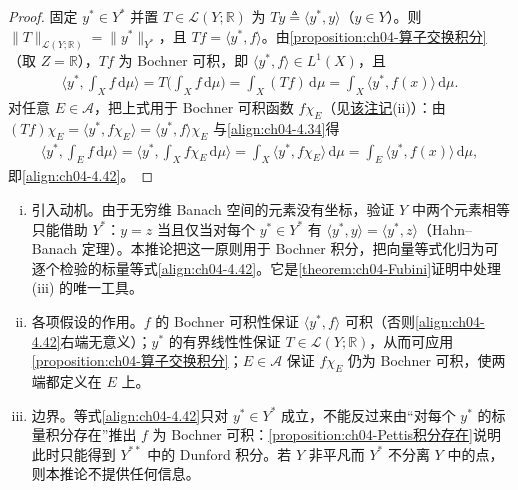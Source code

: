 \documentclass[../../main.tex]{subfiles}%
\begin{document}
\begin{proof}
固定 $y^*\in Y^*$ 并置 $T\in\mathcal{L}(Y;\mathbb{R})$ 为 $Ty\triangleq\langle y^*,y\rangle$（$y\in Y$）。则 $\|T\|_{\mathcal{L}(Y;\mathbb{R})}=\|y^*\|_{Y^*}$，且 $Tf=\langle y^*,f\rangle$。由\cref{proposition:ch04-算子交换积分}（取 $Z=\mathbb{R}$），$Tf$ 为 Bochner 可积，即 $\langle y^*,f\rangle\in L^1(X)$，且
\begin{align*}
\Big\langle y^*,\int_X f\,\mathrm{d}\mu\Big\rangle=T\Big(\int_X f\,\mathrm{d}\mu\Big)=\int_X(Tf)\,\mathrm{d}\mu=\int_X\langle y^*,f(x)\rangle\,\mathrm{d}\mu.
\end{align*}
对任意 $E\in\mathcal{A}$，把上式用于 Bochner 可积函数 $f\chi_E$（见\hyperref[remark:ch04-Bochner良定义]{该注记}(ii)）：由 $(Tf)\chi_E=\langle y^*,f\chi_E\rangle=\langle y^*,f\rangle\chi_E$ 与\eqref{align:ch04-4.34}得
\begin{align*}
\Big\langle y^*,\int_E f\,\mathrm{d}\mu\Big\rangle=\Big\langle y^*,\int_X f\chi_E\,\mathrm{d}\mu\Big\rangle=\int_X\langle y^*,f\chi_E\rangle\,\mathrm{d}\mu=\int_E\langle y^*,f(x)\rangle\,\mathrm{d}\mu,
\end{align*}
即\eqref{align:ch04-4.42}。
\end{proof}

\begin{remark}\label{remark:ch04-对偶配对动机}
\begin{enumerate}[(i)]
\item 引入动机。由于无穷维 Banach 空间的元素没有坐标，验证 $Y$ 中两个元素相等只能借助 $Y^*$：$y=z$ 当且仅当对每个 $y^*\in Y^*$ 有 $\langle y^*,y\rangle=\langle y^*,z\rangle$（Hahn--Banach 定理）。本推论把这一原则用于 Bochner 积分，把向量等式化归为可逐个检验的标量等式\eqref{align:ch04-4.42}。它是\cref{theorem:ch04-Fubini}证明中处理 (iii) 的唯一工具。

\item 各项假设的作用。$f$ 的 Bochner 可积性保证 $\langle y^*,f\rangle$ 可积（否则\eqref{align:ch04-4.42}右端无意义）；$y^*$ 的有界线性性保证 $T\in\mathcal{L}(Y;\mathbb{R})$，从而可应用\cref{proposition:ch04-算子交换积分}；$E\in\mathcal{A}$ 保证 $f\chi_E$ 仍为 Bochner 可积，使两端都定义在 $E$ 上。

\item 边界。等式\eqref{align:ch04-4.42}只对 $y^*\in Y^*$ 成立，不能反过来由“对每个 $y^*$ 的标量积分存在”推出 $f$ 为 Bochner 可积：\cref{proposition:ch04-Pettis积分存在}说明此时只能得到 $Y^{**}$ 中的 Dunford 积分。若 $Y$ 非平凡而 $Y^*$ 不分离 $Y$ 中的点，则本推论不提供任何信息。
\end{enumerate}
\end{remark}
\end{document}
